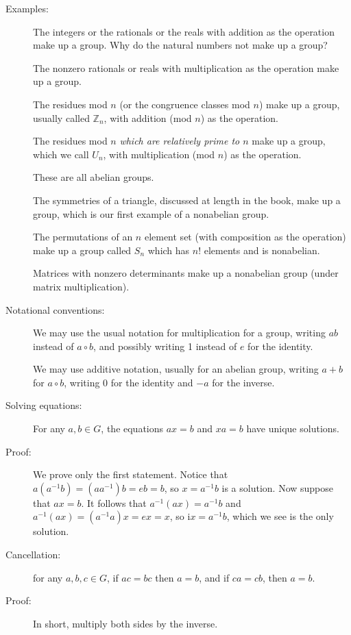 \documentclass[12pt]{article}
\begin{document}
\begin{description}
\item[Examples:]  The integers or the rationals or the reals with addition as the operation make up a group.  Why do the natural numbers not make up a group?

The nonzero rationals or reals with multiplication as the operation make up a group.

The residues mod $n$ (or the congruence classes mod $n$) make up a group, usually called ${\mathbb Z}_n$, with addition (mod $n$) as the operation.

The residues mod $n$ {\em which are relatively prime to $n$\/} make up a group, which we call $U_n$, with multiplication (mod $n$) as the operation.

These are all abelian groups.

The symmetries of a triangle, discussed at length in the book, make up a group, which is our first example of a nonabelian group.

The permutations of an $n$ element set (with composition as the operation) make up a group called $S_n$ which has $n!$ elements and is nonabelian.

Matrices with nonzero determinants make up a nonabelian group (under matrix multiplication).



\item[Notational conventions:]  We may use the usual notation for multiplication for a group, writing $ab$ instead of $a \circ b$, and possibly writing 1 instead of $e$ for the identity.

We may use additive notation, usually for an abelian group, writing $a+b$ for $a \circ b$, writing 0 for the identity and $-a$ for the inverse.

\item[Solving equations:]  For any $a,b \in G$, the equations $ax=b$ and $xa=b$ have unique solutions.

\item[Proof:]  We prove only the first statement.  Notice that $a(a^{-1}b) = (aa^{-1})b = eb = b$, so $x = a^{-1}b$ is a solution.  Now suppose that $ax=b$.  It follows that $a^{-1}(ax) = a^{-1}b$ and $a^{-1}(ax) = (a^{-1}a)x = ex = x$, so i$x = a^{-1}b$, which we see is the only solution.

\item[Cancellation:]  for any $a,b,c \in G$, if $ac=bc$ then $a=b$, and if $ca = cb$, then $a=b$.

\item[Proof:]  In short, multiply both sides by the inverse.


\end{description}
\end{document}
